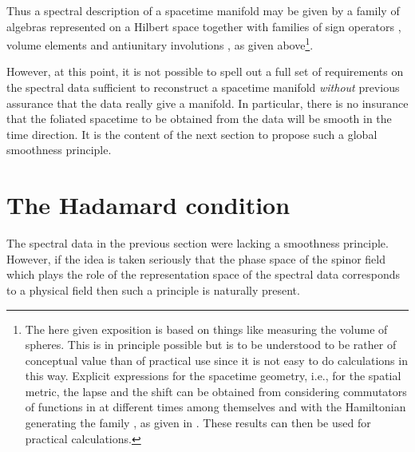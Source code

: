 \documentclass[a4paper,10pt,oneside]{amsart}
\theoremstyle{plain}
\theoremstyle{definition}
\theoremstyle{remark}
\begin{document}
Thus a spectral description of a spacetime manifold may be given
by a family of algebras \coordHE{} represented on a Hilbert space
\coordHE{} together with families of sign operators \coordHE{},
volume elements \coordHE{} and antiunitary involutions
\coordHE{}, as given above\footnote{The here given exposition is
based on things like measuring the volume of spheres. This is in
principle possible but is to be understood to be rather of
conceptual value than of practical use since it is not easy to do
calculations in this way. Explicit expressions for the spacetime
geometry, i.e., for the spatial metric, the lapse and the shift
can be obtained from considering commutators of functions in
\coordHE{} at different times among themselves and with the
Hamiltonian generating the family \coordHE{}, as given in
\cite{Kopf-Paschke2000}. These results can then be used for
practical calculations.}.




However, at this point, it is not possible to spell out a full set
of requirements on the spectral data sufficient to reconstruct a
spacetime manifold {\em without} previous assurance that the data
really give a manifold. In particular, there is no insurance that
the foliated spacetime to be obtained from the data will be smooth
in the time direction. It is the content of the next section to
propose such a global smoothness
principle.



\section{The Hadamard condition}\label{hadamard}


The spectral data in the previous section were lacking a
smoothness principle. However, if the idea is taken seriously
that the phase space of the spinor field \myHighlight{$\psi$}\coordHE{} which plays the
role of the representation space \coordHE{} of the spectral
data corresponds to a physical field then such a principle is
naturally present.
\end{document}
